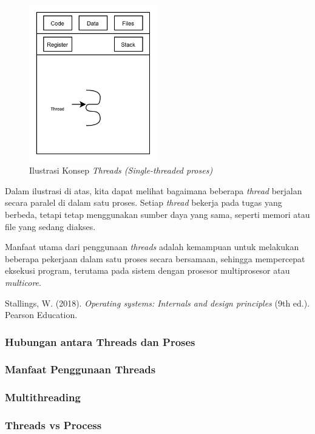 \documentclass[12pt]{article}
\begin{document}
\begin{figure}[h]
    \centering
    \includegraphics[width=0.5\textwidth]{asset/Gambar-konsep-threads.jpeg}
    \caption{Ilustrasi Konsep \textit{Threads (Single-threaded proses)} }
    \label{fig:konsep-threads}
\end{figure}

Dalam ilustrasi di atas, kita dapat melihat bagaimana beberapa \textit{thread} berjalan secara paralel di dalam satu proses. Setiap \textit{thread} bekerja pada tugas yang berbeda, tetapi tetap menggunakan sumber daya yang sama, seperti memori atau file yang sedang diakses.

Manfaat utama dari penggunaan \textit{threads} adalah kemampuan untuk melakukan beberapa pekerjaan dalam satu proses secara bersamaan, sehingga mempercepat eksekusi program, terutama pada sistem dengan prosesor multiprosesor atau \textit{multicore}.


Stallings, W. (2018). \textit{Operating systems: Internals and design principles} (9th ed.). Pearson Education.
\subsubsection{Hubungan antara Threads dan Proses}
\subsubsection{Manfaat Penggunaan Threads}
\subsubsection{Multithreading}
\subsubsection{Threads vs Process}
\end{document}
